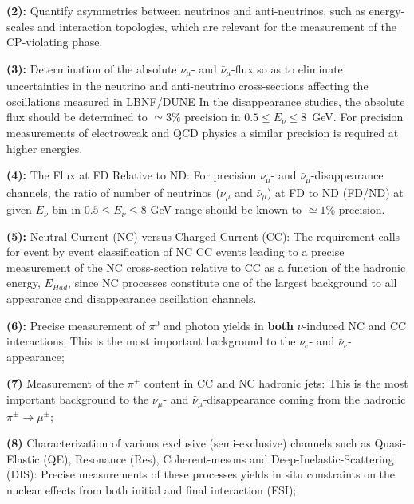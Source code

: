 \vspace{0.25cm} 
\noindent
{\bf (2):} Quantify asymmetries between neutrinos and anti-neutrinos, such as 
energy-scales and interaction topologies, which are relevant for the measurement of the CP-violating phase. 


\vspace{0.25cm} 
\noindent
{\bf (3):} Determination of the absolute $\nu_\mu$- and $\bar \nu_\mu$-flux so as to  eliminate uncertainties in the neutrino and anti-neutrino cross-sections 
affecting the oscillations measured  in LBNF/DUNE In the  disappearance 
studies, the absolute flux should be determined to $\simeq 3\%$ precision in 
$0.5 \leq E_\nu \leq 8$~GeV. For precision measurements of electroweak 
and QCD physics a similar precision is required at higher energies. 

\vspace{0.25cm} 
\noindent
{\bf (4):} The  Flux at FD Relative to ND: For precision $\nu_\mu$- and $\bar \nu_\mu$-disappearance  
channels, the ratio of number of neutrinos ($\nu_\mu$  and $\bar \nu_\mu$) at FD to ND (FD/ND) 
at given $E_\nu$ bin in $0.5 \leq E_\nu \leq 8$ GeV range should be known 
to $\simeq 1\%$ precision. 

\vspace{0.25cm} 
\noindent
{\bf (5):} Neutral Current (NC) versus Charged Current (CC): 
The requirement calls for event by event classification of NC  
CC events leading to a precise measurement of 
the NC cross-section relative to 
CC as a function of the hadronic energy, $E_{Had}$, since NC processes 
constitute one of the largest background to all appearance and disappearance oscillation 
channels.

\vspace{0.25cm} 
\noindent
{\bf (6):} Precise measurement 
of $\pi^0$ and photon yields  in {\bf both}  $\nu$-induced 
NC and CC interactions: This is the most important background to the $\nu_e$- and $\bar \nu_e$-appearance; 


\vspace{0.25cm} 
\noindent
{\bf (7)} Measurement of the $\pi^{\pm}$ content in 
CC and NC hadronic jets:  This is the most important background to 
the $\nu_\mu$- and $\bar \nu_\mu$-disappearance coming from  the hadronic   $\pi^{\pm} \rightarrow \mu^{\pm}$; 

\vspace{0.25cm} 
\noindent
{\bf (8)} Characterization of various exclusive (semi-exclusive) 
channels such as Quasi-Elastic (QE), Resonance (Res), 
Coherent-mesons and Deep-Inelastic-Scattering (DIS): 
Precise measurements of these processes yields  
 in situ constraints on the nuclear effects from both initial and final interaction (FSI); 

